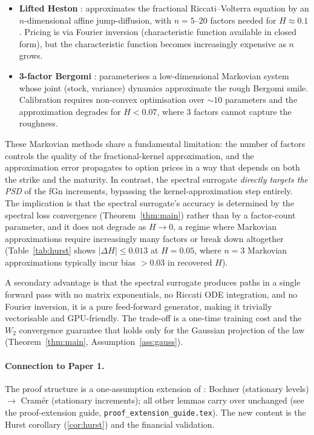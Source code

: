 \documentclass[11pt,a4paper]{article}
\begin{document}
\begin{itemize}
 \item \textbf{Lifted Heston} \citep{abijaber2019affine,el2019perfect}:
  approximates the fractional Riccati--Volterra equation by an
  $n$-dimensional affine jump-diffusion, with $n=5$--$20$ factors
  needed for $H \approx 0.1$. Pricing is via Fourier inversion
  (characteristic function available in closed form), but the
  characteristic function becomes increasingly expensive as $n$ grows.
 \item \textbf{3-factor Bergomi} \citep{bayer2020markovian}:
  parameterises a low-dimensional Markovian system whose joint
  (stock, variance) dynamics approximate the rough Bergomi
  smile. Calibration requires non-convex optimisation over
  $\sim 10$ parameters and the approximation degrades for
  $H < 0.07$, where 3 factors cannot capture the roughness.
\end{itemize}

These Markovian methods share a fundamental limitation: the number of
factors controls the quality of the fractional-kernel approximation, and
the approximation error propagates to option prices in a way that depends
on both the strike and the maturity. In contrast, the spectral surrogate
\emph{directly targets the PSD} of the fGn increments, bypassing the
kernel-approximation step entirely. The implication is that the spectral
surrogate's accuracy is determined by the spectral loss convergence
(Theorem~\ref{thm:main}) rather than by a factor-count parameter, and it
does not degrade as $H \to 0$, a regime where Markovian approximations
require increasingly many factors or break down altogether (Table~\ref{tab:hurst}
shows $|\Delta H| \leq 0.013$ at $H=0.05$, where $n=3$ Markovian
approximations typically incur bias $>0.03$ in recovered $H$).

A secondary advantage is that the spectral surrogate produces paths in
a single forward pass with no matrix exponentials, no Riccati ODE
integration, and no Fourier inversion, it is a pure feed-forward
generator, making it trivially vectorisable and GPU-friendly. The
trade-off is a one-time training cost and the $W_2$ convergence
guarantee that holds only for the Gaussian projection of the law
(Theorem~\ref{thm:main}, Assumption~\ref{ass:gauss}).

\paragraph{Connection to Paper 1.}
The proof structure is a one-assumption extension of \citet{TODO-paper1}:
Bochner (stationary levels) $\to$ Cramér (stationary increments);
all other lemmas carry over unchanged (see the proof-extension guide,
\texttt{proof\_extension\_guide.tex}). The new content is the Hurst
corollary (\cref{cor:hurst}) and the financial validation.
\end{document}
